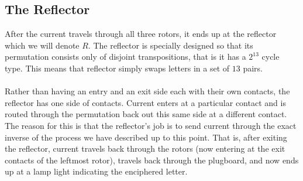 

\subsection{The Reflector}
After the current travels through all three rotors, it ends up at the
reflector which we will denote $R$. The reflector is specially
designed so that its permutation consists only of disjoint
transpositions, that is it has a $2^{13}$ cycle type. This means that
reflector simply swaps letters in a set of $13$ pairs.
\\\\Rather than having an entry and an exit side each with their own
contacts, the reflector has one side of contacts. Current enters at a
particular contact and is routed through the permutation back out
this same side at a different contact. The reason for this is that
the reflector's job is to send current through the exact inverse of
the process we have described up to this point. That is, after
exiting the reflector, current travels back through the rotors (now
entering at the exit contacts of the leftmost rotor), travels back
through the plugboard, and now ends up at a lamp light indicating the
enciphered letter.

